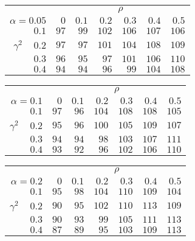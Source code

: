 \begin{tabular}{r|rrrrrr}
\hline\hline
 &\multicolumn{6}{c}{$\rho$} \\ 
 $\alpha = 0.05$ & $0$ & $0.1$ & $0.2$ & $0.3$ & $0.4$ & $0.5$ \\ 
 \hline$0.1$ & $ 97$ & $ 99$ & $102$ & $106$ & $107$ & $106$\\ 
$\gamma^2\;\;\;$ $0.2$ & $ 97$ & $ 97$ & $101$ & $104$ & $108$ & $109$\\ 
$0.3$ & $ 96$ & $ 95$ & $ 97$ & $101$ & $106$ & $110$\\ 
$0.4$ & $ 94$ & $ 94$ & $ 96$ & $ 99$ & $104$ & $108$\\ 
 \hline 
 \end{tabular}
 
 \vspace{2em} 
 
\begin{tabular}{r|rrrrrr}
\hline\hline
 &\multicolumn{6}{c}{$\rho$} \\ 
 $\alpha = 0.1$ & $0$ & $0.1$ & $0.2$ & $0.3$ & $0.4$ & $0.5$ \\ 
 \hline$0.1$ & $ 97$ & $ 96$ & $104$ & $108$ & $108$ & $105$\\ 
$\gamma^2\;\;\;$ $0.2$ & $ 95$ & $ 96$ & $100$ & $105$ & $109$ & $107$\\ 
$0.3$ & $ 94$ & $ 94$ & $ 98$ & $103$ & $107$ & $111$\\ 
$0.4$ & $ 93$ & $ 92$ & $ 96$ & $102$ & $106$ & $110$\\ 
 \hline 
 \end{tabular}
 
 \vspace{2em} 
 
\begin{tabular}{r|rrrrrr}
\hline\hline
 &\multicolumn{6}{c}{$\rho$} \\ 
 $\alpha = 0.2$ & $0$ & $0.1$ & $0.2$ & $0.3$ & $0.4$ & $0.5$ \\ 
 \hline$0.1$ & $ 95$ & $ 98$ & $104$ & $110$ & $109$ & $104$\\ 
$\gamma^2\;\;\;$ $0.2$ & $ 90$ & $ 95$ & $102$ & $110$ & $113$ & $109$\\ 
$0.3$ & $ 90$ & $ 93$ & $ 99$ & $105$ & $111$ & $113$\\ 
$0.4$ & $ 87$ & $ 89$ & $ 95$ & $103$ & $109$ & $113$\\ 
 \hline 
 \end{tabular}